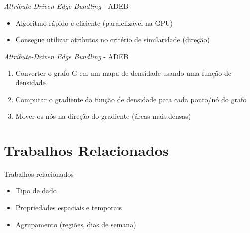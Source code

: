\begin{frame}{\emph{Attribute-Driven Edge Bundling} - ADEB}
  \begin{itemize}
    \item Algoritmo rápido e eficiente (paralelizável na GPU)
    \item Consegue utilizar atributos no critério de similaridade (direção)
  \end{itemize}
\end{frame}

\begin{frame}{\emph{Attribute-Driven Edge Bundling} - ADEB}
  \begin{enumerate}
    \item Converter o grafo G em um mapa de densidade usando uma função de densidade
    \item Computar o gradiente da função de densidade para cada ponto/nó do grafo
    \item Mover os nós na direção do gradiente (áreas mais densas)
  \end{enumerate}
\end{frame}

\section{Trabalhos Relacionados}

\begin{frame}{Trabalhos relacionados}
  \begin{itemize}
    \item Tipo de dado

    \item Propriedades espaciais e temporais

    \item Agrupamento (regiões, dias de semana)
  \end{itemize}
\end{frame}

